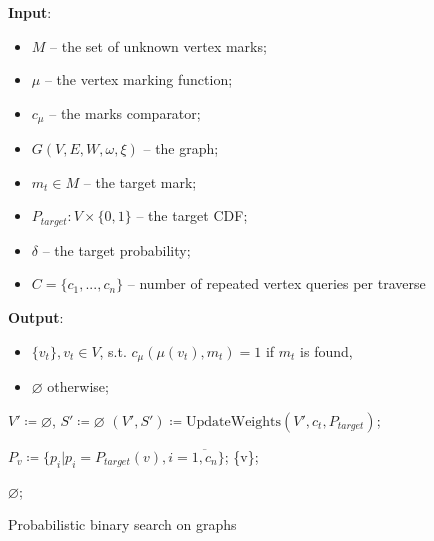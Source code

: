 \begin{figure}[H]
    \begin{framed}
        \begin{algorithmic}[1]
            \State \textbf{Input}:
            \begin{itemize}
            	\item $M$ -- the set of unknown vertex marks;
            	\item $\mu$ -- the vertex marking function;
            	\item $c_\mu$ -- the marks comparator;
            	\item $G(V, E, W, \omega, \xi)$ -- the graph;
            	\item $m_t \in M$ -- the target mark;
            	\item $P_{target}: V \times \{0,1\}$ -- the target CDF;
            	\item $\delta$ -- the target probability;
            	\item $C = \{c_1, ..., c_n\}$ -- number of repeated vertex queries per traverse
            \end{itemize}
            
            \State \textbf{Output}:
			\begin{itemize}
            	\item $\{v_t\}, v_t \in V$, s.t. $c_\mu(\mu(v_t), m_t) = 1$ if $m_t$ is found,
            	\item $\varnothing$ otherwise;
			\end{itemize}

			\State $V\prime \coloneqq \varnothing$, $S\prime \coloneqq \varnothing$
				\State $(V\prime, S\prime) \coloneqq \text{UpdateWeights}(V\prime, c_t, P_{target})$;
			\EndFor

				\State $P_v \coloneqq \{ p_i | p_i = P_{target}(v), i = \overline{1, c_n} \}$;
					\State \Return \{v\};
				\EndIf
			\EndFor

            \State \Return $\varnothing$;
        \end{algorithmic}
    \end{framed}
    \caption{Probabilistic binary search on graphs}
    \label{algPrb}
\end{figure}


